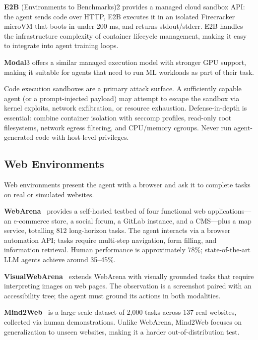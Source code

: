 \textbf{E2B} (Environments to Benchmarks)2 provides a managed cloud sandbox API: the agent sends code over HTTP, E2B executes it in an isolated Firecracker microVM that boots in under 200 ms, and returns stdout/stderr. E2B handles the infrastructure complexity of container lifecycle management, making it easy to integrate into agent training loops.

\textbf{Modal}3 offers a similar managed execution model with stronger GPU support, making it suitable for agents that need to run ML workloads as part of their task.

\begin{warningbox}
Code execution sandboxes are a primary attack surface. A sufficiently capable agent (or a prompt-injected payload) may attempt to escape the sandbox via kernel exploits, network exfiltration, or resource exhaustion. Defense-in-depth is essential: combine container isolation with seccomp profiles, read-only root filesystems, network egress filtering, and CPU/memory cgroups. Never run agent-generated code with host-level privileges.
\end{warningbox}

\subsection{Web Environments}
\label{web-environments}

Web environments present the agent with a browser and ask it to complete tasks on real or simulated websites.

\textbf{WebArena}~\cite{zhou2024webarena} provides a self-hosted testbed of four functional web applications---an e-commerce store, a social forum, a GitLab instance, and a CMS---plus a map service, totalling 812 long-horizon tasks. The agent interacts via a browser automation API; tasks require multi-step navigation, form filling, and information retrieval. Human performance is approximately 78\%; state-of-the-art LLM agents achieve around 35--45\%.

\textbf{VisualWebArena}~\cite{koh2024visualwebarena} extends WebArena with visually grounded tasks that require interpreting images on web pages. The observation is a screenshot paired with an accessibility tree; the agent must ground its actions in both modalities.

\textbf{Mind2Web}~\cite{deng2024mind2web} is a large-scale dataset of 2,000 tasks across 137 real websites, collected via human demonstrations. Unlike WebArena, Mind2Web focuses on generalization to unseen websites, making it a harder out-of-distribution test.

